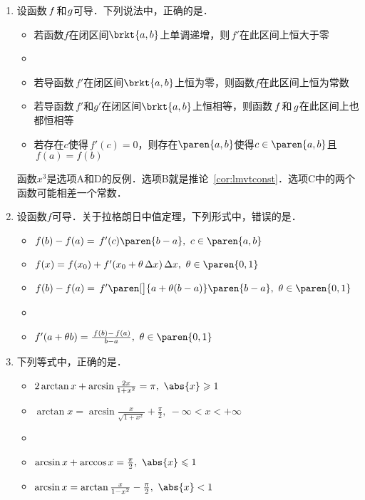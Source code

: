 \begin{enumerate}
\item 设函数\(\,f\mkern2mu\)和\(\mkern1mu g\)可导．下列说法中，正确的是\uline{\hspace{10em}}．
  \begin{itemize}
    \renewcommand{\labelitemi}{\faCircleThin}
  \item 若函数\(f\)在闭区间\(\brkt{a,b}\)上单调递增，则\(\,f'\!\)在此区间上恒大于零
    \ifshowsol
    \item[\faCircle]
    \else
    \item
    \fi
    若导函数\(\,f'\!\)在闭区间\(\brkt{a,b}\)上恒为零，则函数\(f\)在此区间上恒为常数
  \item 若导函数\(\,f'\!\)和\(g'\!\)在闭区间\(\brkt{a,b}\)上恒相等，则函数\(\,f\mkern2mu\)和\(\mkern2mu g\)在此区间上也都恒相等
  \item 若存在\(c\)使得\(\,f'(c) = 0\)，则存在\(\paren{a,b}\)使得\(c \in \paren{a,b}\)且\(\,f(a) = f(b)\)
  \end{itemize}

  \ifshowsol
    函数\(x^3\)是选项A和D的反例．选项B就是推论~\ref{cor:lmvtconst}．选项C中的两个函数可能相差一个常数．
  \fi

\item 设函数\(f\)可导．关于拉格朗日中值定理，下列形式中，错误的是\uline{\hspace{10em}}．
  \begin{itemize}
    \renewcommand{\labelitemi}{\faCircleThin}
  \item \(f(b) - f(a) = \,f'(c) \paren{b-a},\ c \in \paren{a,b}\)
  \item \(f(x) = f(x_0) + f'(x_0 + \theta\fdx) \fdx,\ \theta \in \paren{0,1}\)
  \item \(f(b) - f(a) = \,f'\paren[\big]{a + \theta(b-a)} \paren{b-a},\ \theta \in \paren{0,1}\)
    \ifshowsol
    \item[\faCircle]
    \else
    \item
    \fi
    \(f'(a + \theta b) = \frac{\,f(b)-\,f(a)}{b-a},\ \theta \in \paren{0,1}\)
  \end{itemize}

\item 下列等式中，正确的是\uline{\hspace{10em}}．
  \begin{itemize}
    \renewcommand{\labelitemi}{\faCircleThin}
  \item \(2\arctan x + \arcsin\frac{2x}{1+x^2} = \pi,\ \abs{x} \ge 1\)
  \item \(\arctan x = \arcsin\frac{x}{\sqrt{1+x^2}} + \frac\pi2,\ -\infty < x < +\infty\)
    \ifshowsol
    \item[\faCircle]
    \else
    \item
    \fi
    \(\arcsin x + \arccos x = \frac\pi2,\ \abs{x} \le 1\)
  \item \(\arcsin x = \arctan\frac{x}{1-x^2} - \frac\pi2,\ \abs{x} < 1\)
  \end{itemize}


\end{enumerate}
